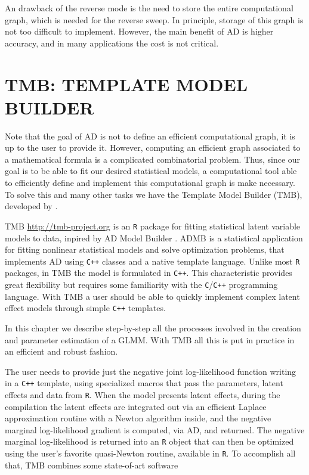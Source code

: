 An drawback of the reverse mode is the need to store the entire
computational graph, which is needed for the reverse sweep. In
principle, storage of this graph is not too difficult to implement.
However, the main benefit of AD is higher accuracy, and in many
applications the cost is not critical.

\section{TMB: TEMPLATE MODEL BUILDER}
\label{cap:tmb}

Note that the goal of AD is not to define an efficient computational
graph, it is up to the user to provide it. However, computing an
efficient graph associated to a mathematical formula is a complicated
combinatorial problem. Thus, since our goal is to be able to fit our
desired statistical models, a computational tool able to efficiently
define and implement this computational graph is make necessary. To
solve this and many other tasks we have the Template Model Builder
(TMB), developed by .

TMB \url{ http://tmb-project.org} is an \texttt{R} \cite{R18} package
for fitting statistical latent variable models to data, inpired by AD
Model Builder \cite[ADMB]{ADMB}. ADMB is a statistical application for
fitting nonlinear statistical models and solve optimization problems,
that implements AD using \texttt{C++} classes and a native template
language. Unlike most \texttt{R} packages, in TMB the model is
formulated in \texttt{C++}. This characteristic provides great
flexibility but requires some familiarity with the
\texttt{C}/\texttt{C++} programming language. With TMB a user should be
able to quickly implement complex latent effect models through simple
\texttt{C++} templates.

In this chapter we describe step-by-step all the processes involved in
the creation and parameter estimation of a GLMM. With TMB all this is
put in practice in an efficient and robust fashion.

The user needs to provide just the negative joint log-likelihood
function writing in a \texttt{C++} template, using specialized macros
that pass the parameters, latent effects and data from \texttt{R}. When
the model presents latent effects, during the compilation the latent
effects are integrated out via an efficient Laplace approximation
routine with a Newton algorithm inside, and the negative marginal
log-likelihood gradient is computed, via AD, and returned. The negative
marginal log-likelihood is returned into an \texttt{R} object that can
then be optimized using the user's favorite quasi-Newton routine,
available in \texttt{R}. To accomplish all that, TMB combines some
state-of-art software

